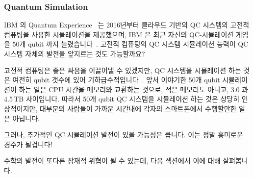 \subsubsection{Quantum Simulation}
\label{sec:future:Quantum Simulation}

IBM 의 Quantum Experience~\cite{IBM2016QuantumExperience} 는 2016년부터
클라우드 기반의 QC 시스템의 고전적 컴퓨팅을 사용한 시뮬레이션을 제공했으며, IBM
은 최근 자신의 QC-시뮬레이션 게임을 50개 qubit 까지
늘렸습니다~\cite{WillKnight2017IBM50qubitSim}.
고전적 컴퓨팅의 QC 시스템 시뮬레이션 능력이 QC 시스템 자체의 발전을 앞지르는
것도 가능할까요?

고전적 컴퓨팅은 좋은 싸움을 이끌어낼 수 있겠지만, QC 시스템을 시뮬레이션 하는
것은 여전히 qubit 갯수에 있어
기하급수적입니다~\cite{ScottAaronson2017IBM50qubitSim}.
앞서 이야기한 50개 qubit 시뮬레이션이 하는 일은 CPU 시간을 메모리와 교환하는
것으로, 적은 메모리도 아니고, 3.0 과 4.5\,TB 사이입니다.
따라서 50개 qubit QC 시스템을 시뮬레이션 하는 것은 상당히 인상적이지만,
대부분의 사람들이 가까운 시간내에 각자의 스마트폰에서 수행할만한 일은 아닙니다.

그러나, 추가적인 QC 시뮬레이션 발전이 있을 가능성은 큽니다.
이는 정말 흥미로운 경주가 될겁니다!

수학의 발전이 또다른 잠재적 위협이 될 수 있는데, 다음 섹션에서 이에 대해
살펴봅니다.

